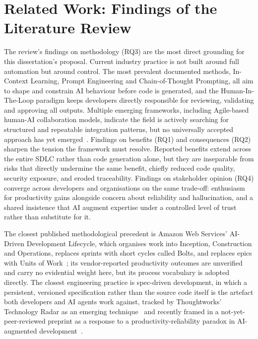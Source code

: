 \documentclass[sigconf,review=false]{acmart}
\begin{document}
\section{Related Work: Findings of the Literature Review}
\label{sec:related}

The review's findings on methodology (RQ3) are the most direct grounding for this dissertation's proposal. Current industry practice is not built around full automation but around control. The most prevalent documented methods, In-Context Learning, Prompt Engineering and Chain-of-Thought Prompting, all aim to shape and constrain AI behaviour before code is generated, and the Human-In-The-Loop paradigm keeps developers directly responsible for reviewing, validating and approving all outputs. Multiple emerging frameworks, including Agile-based human-AI collaboration models, indicate the field is actively searching for structured and repeatable integration patterns, but no universally accepted approach has yet emerged~\cite{Ahmed:2025ai}. Findings on benefits (RQ1) and consequences (RQ2) sharpen the tension the framework must resolve. Reported benefits extend across the entire SDLC rather than code generation alone, but they are inseparable from risks that directly undermine the same benefit, chiefly reduced code quality, security exposure, and eroded traceability. Findings on stakeholder opinion (RQ4) converge across developers and organisations on the same trade-off: enthusiasm for productivity gains alongside concern about reliability and hallucination, and a shared insistence that AI augment expertise under a controlled level of trust rather than substitute for it.

The closest published methodological precedent is Amazon Web Services' AI-Driven Development Lifecycle, which organises work into Inception, Construction and Operations, replaces sprints with short cycles called Bolts, and replaces epics with Units of Work~\cite{AWS:2025aidlc}; its vendor-reported productivity outcomes are unverified and carry no evidential weight here, but its process vocabulary is adopted directly. The closest engineering practice is spec-driven development, in which a persistent, versioned specification rather than the source code itself is the artefact both developers and AI agents work against, tracked by Thoughtworks' Technology Radar as an emerging technique~\cite{Thoughtworks:2025SD} and recently framed in a not-yet-peer-reviewed preprint as a response to a productivity-reliability paradox in AI-augmented development~\cite{Farrag:2026sd}.
\end{document}
